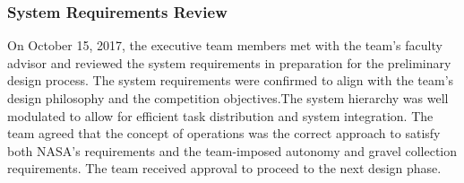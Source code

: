 \documentclass[class=article, crop=false]{standalone}
\begin{document}
	\subsubsection{System Requirements Review}
	On October 15, 2017, the executive team members met with the team’s faculty advisor and reviewed the system requirements in preparation for the preliminary design process. The system requirements were confirmed to align with the team’s design philosophy and the competition objectives.The system hierarchy was well modulated to allow for efficient task distribution and system integration. The team agreed that the concept of operations was the correct approach to satisfy both NASA’s requirements and the team-imposed autonomy and gravel collection requirements. The team received approval to proceed to the next design phase.




	
\end{document}
